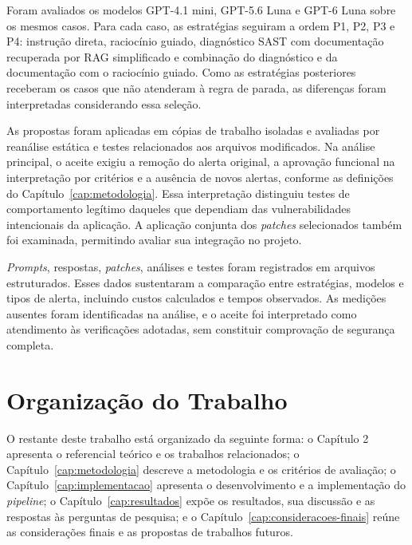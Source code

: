 Foram avaliados os modelos GPT-4.1 mini, GPT-5.6 Luna e GPT-6 Luna sobre os mesmos casos. Para cada caso, as estratégias seguiram a ordem P1, P2, P3 e P4: instrução direta, raciocínio guiado, diagnóstico SAST com documentação recuperada por RAG simplificado e combinação do diagnóstico e da documentação com o raciocínio guiado. Como as estratégias posteriores receberam os casos que não atenderam à regra de parada, as diferenças foram interpretadas considerando essa seleção.

As propostas foram aplicadas em cópias de trabalho isoladas e avaliadas por reanálise estática e testes relacionados aos arquivos modificados. Na análise principal, o aceite exigiu a remoção do alerta original, a aprovação funcional na interpretação por critérios e a ausência de novos alertas, conforme as definições do Capítulo~\ref{cap:metodologia}. Essa interpretação distinguiu testes de comportamento legítimo daqueles que dependiam das vulnerabilidades intencionais da aplicação. A aplicação conjunta dos \textit{patches} selecionados também foi examinada, permitindo avaliar sua integração no projeto.

\textit{Prompts}, respostas, \textit{patches}, análises e testes foram registrados em arquivos estruturados. Esses dados sustentaram a comparação entre estratégias, modelos e tipos de alerta, incluindo custos calculados e tempos observados. As medições ausentes foram identificadas na análise, e o aceite foi interpretado como atendimento às verificações adotadas, sem constituir comprovação de segurança completa.

\section{Organização do Trabalho}
O restante deste trabalho está organizado da seguinte forma: o Capítulo 2 apresenta o referencial teórico e os trabalhos relacionados; o Capítulo~\ref{cap:metodologia} descreve a metodologia e os critérios de avaliação; o Capítulo~\ref{cap:implementacao} apresenta o desenvolvimento e a implementação do \textit{pipeline}; o Capítulo~\ref{cap:resultados} expõe os resultados, sua discussão e as respostas às perguntas de pesquisa; e o Capítulo~\ref{cap:consideracoes-finais} reúne as considerações finais e as propostas de trabalhos futuros.
